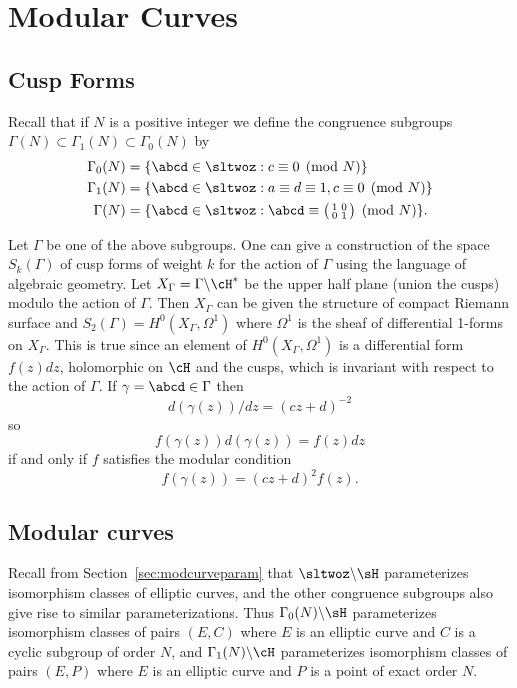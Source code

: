 \documentclass{report}
\begin{document}
\chapter{Modular Curves}\label{ch:modcurves}
\section{Cusp Forms}
Recall that if $N$ is a positive integer we define the congruence
subgroups
$\Gamma(N)\subset\Gamma_1(N)\subset\Gamma_0(N)$ by
\begin{align*}
\Gamma_0(N) & = \{\abcd \in \sltwoz : c\equiv 0 \pmod{N}\}\\
\Gamma_1(N) & = \{\abcd \in \sltwoz : a\equiv d\equiv 1, c\equiv 0 \pmod{N}\}\\
\Gamma(N) & = \{\abcd \in \sltwoz : \abcd \equiv
             \bigl(\begin{smallmatrix}1&0\\0&1\end{smallmatrix}\bigr) \pmod{N}\}.
\end{align*}

Let $\Gamma$ be one of the above subgroups.
One can give a construction of the space $S_k(\Gamma)$ of cusp forms
of weight $k$ for the action of $\Gamma$ using the language of
algebraic geometry.
Let $X_{\Gamma}=\Gamma\backslash\cH^{*}$
be the upper half plane (union the cusps)
modulo the action of $\Gamma$. Then $X_{\Gamma}$ can be given the structure
of compact Riemann surface and
$S_2(\Gamma)=H^0(X_{\Gamma},\Omega^1)$ where
$\Omega^1$ is the sheaf of differential 1-forms on $X_{\Gamma}$.
This is true since an element of $H^0(X_{\Gamma},\Omega^1)$
is a differential form $f(z)dz$, holomorphic on $\cH$ and
the cusps, which is invariant with respect to the action
of $\Gamma$. If $\gamma=\abcd\in\Gamma$ then
$$d(\gamma(z))/dz=(cz+d)^{-2}$$
so
$$f(\gamma(z))d(\gamma(z))=f(z)dz$$
if and only if $f$ satisfies the modular condition
$$f(\gamma(z))=(cz+d)^{2}f(z).$$


\section{Modular curves}
Recall from Section~\ref{sec:modcurveparam} that
$\sltwoz\backslash\sH$ parameterizes isomorphism classes of elliptic
curves, and the other congruence subgroups also give rise to similar
parameterizations.  Thus $\Gamma_0(N)\backslash\sH$ parameterizes
isomorphism classes of pairs $(E,C)$ where $E$ is an elliptic curve
and $C$ is a cyclic subgroup of order $N$, and
$\Gamma_1(N)\backslash\cH$ parameterizes isomorphism classes of pairs
$(E,P)$ where $E$ is an elliptic curve and $P$ is a point of exact
order $N$.
\end{document}
